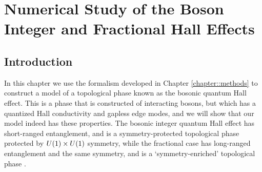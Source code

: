 
\chapter{Numerical Study of the Boson Integer and Fractional Hall Effects}
\label{chapter::FQHE}

\section{Introduction}

In this chapter we use the formalism developed in Chapter \ref{chapter::methods} to construct a model of a topological phase known as the bosonic quantum Hall effect. This is a phase that is constructed of interacting bosons, but which has a quantized Hall conductivity and gapless edge modes, and we will show that our model indeed has these properties. The bosonic integer quantum Hall effect has short-ranged entanglement, and is a symmetry-protected topological phase protected by $U(1)\times U(1)$ symmetry, while the fractional case has long-ranged entanglement and the same symmetry, and is a `symmetry-enriched' topological phase \cite{EssinHermele}. 

